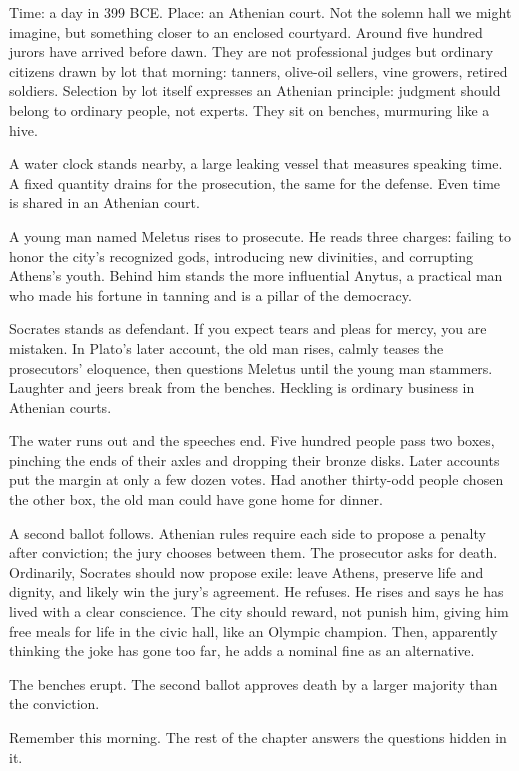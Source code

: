 Time: a day in 399 BCE. Place: an Athenian court. Not the solemn hall we might imagine, but something closer to an enclosed courtyard. Around five hundred jurors have arrived before dawn. They are not professional judges but ordinary citizens drawn by lot that morning: tanners, olive-oil sellers, vine growers, retired soldiers. Selection by lot itself expresses an Athenian principle: judgment should belong to ordinary people, not experts. They sit on benches, murmuring like a hive.

A water clock stands nearby, a large leaking vessel that measures speaking time. A fixed quantity drains for the prosecution, the same for the defense. Even time is shared in an Athenian court.

A young man named Meletus rises to prosecute. He reads three charges: failing to honor the city's recognized gods, introducing new divinities, and corrupting Athens's youth. Behind him stands the more influential Anytus, a practical man who made his fortune in tanning and is a pillar of the democracy.

Socrates stands as defendant. If you expect tears and pleas for mercy, you are mistaken. In Plato's later account, the old man rises, calmly teases the prosecutors' eloquence, then questions Meletus until the young man stammers. Laughter and jeers break from the benches. Heckling is ordinary business in Athenian courts.

The water runs out and the speeches end. Five hundred people pass two boxes, pinching the ends of their axles and dropping their bronze disks. Later accounts put the margin at only a few dozen votes. Had another thirty-odd people chosen the other box, the old man could have gone home for dinner.

A second ballot follows. Athenian rules require each side to propose a penalty after conviction; the jury chooses between them. The prosecutor asks for death. Ordinarily, Socrates should now propose exile: leave Athens, preserve life and dignity, and likely win the jury's agreement. He refuses. He rises and says he has lived with a clear conscience. The city should reward, not punish him, giving him free meals for life in the civic hall, like an Olympic champion. Then, apparently thinking the joke has gone too far, he adds a nominal fine as an alternative.

The benches erupt. The second ballot approves death by a larger majority than the conviction.

Remember this morning. The rest of the chapter answers the questions hidden in it.

